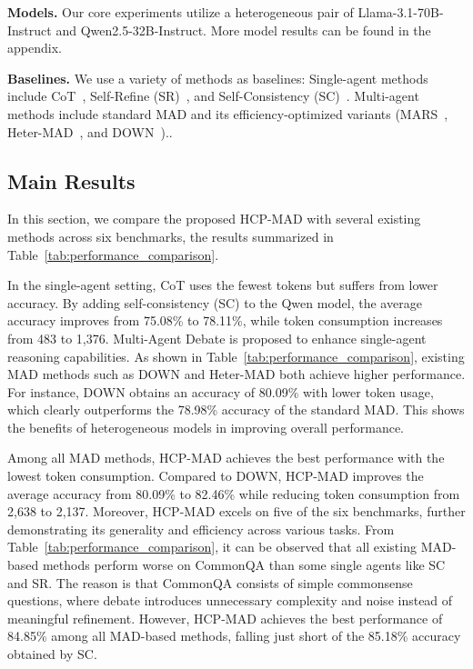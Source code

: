 \documentclass[11pt]{article}
\begin{document}
\noindent\textbf{Models.} Our core experiments utilize a heterogeneous pair of Llama-3.1-70B-Instruct and Qwen2.5-32B-Instruct. More model results can be found in the appendix.

\noindent\textbf{Baselines.} We use a variety of methods as baselines: Single-agent methods include CoT~\cite{wei2022chain}, Self-Refine (SR)~\cite{madaan2023self}, and Self-Consistency (SC)~\cite{wangself}. Multi-agent methods include standard MAD and its efficiency-optimized variants (MARS~\cite{wang2025mars}, Heter-MAD~\cite{zhang2025stop}, and DOWN~\cite{eo2025debate})..

\subsection{Main Results}
In this section, we compare the proposed HCP-MAD with several existing methods across six benchmarks, the results summarized in Table~\ref{tab:performance_comparison}. 

In the single-agent setting, CoT uses the fewest tokens but suffers from lower accuracy. 
By adding self-consistency (SC) to the Qwen model, the average accuracy improves from 75.08\% to 78.11\%, while token consumption increases from 483 to 1,376.  Multi-Agent Debate is proposed to enhance single-agent reasoning capabilities. 
As shown in Table~\ref{tab:performance_comparison}, existing MAD methods such as DOWN and Heter-MAD both achieve higher performance. For instance, DOWN obtains an accuracy of 80.09\% with lower token usage, which clearly outperforms the 78.98\% accuracy of the standard MAD. 
This shows the benefits of heterogeneous models in improving overall performance.%

Among all MAD methods, HCP-MAD achieves the best performance with the lowest token consumption. Compared to DOWN, HCP-MAD improves the average accuracy from 80.09\% to 82.46\% while reducing token consumption from 2,638 to 2,137. 
Moreover, HCP-MAD excels on five of the six benchmarks, further demonstrating its generality and efficiency across various tasks. 
From Table~\ref{tab:performance_comparison}, it can be observed that all existing MAD-based methods perform worse on CommonQA than some single agents like SC and SR. 
The reason is that CommonQA consists of simple commonsense questions, where debate introduces unnecessary complexity and noise instead of meaningful refinement. 
However, HCP-MAD achieves the best performance of 84.85\% among all MAD-based methods, falling just short of the 85.18\% accuracy obtained by SC. 
\end{document}
